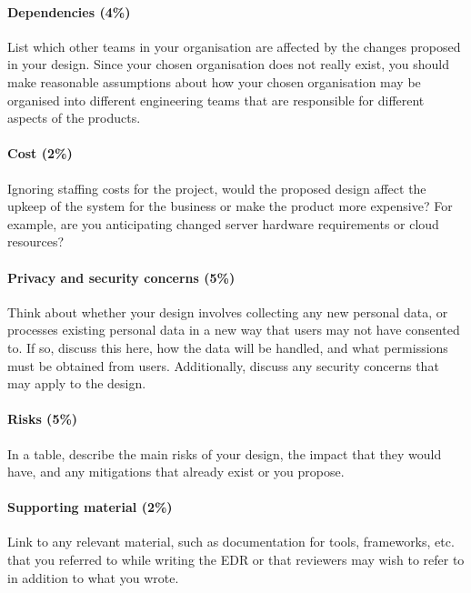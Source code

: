 \paragraph{Dependencies (4\%)} List which other teams in your organisation are affected by the changes proposed in your design. Since your chosen organisation does not really exist, you should make reasonable assumptions about how your chosen organisation may be organised into different engineering teams that are responsible for different aspects of the products.

\paragraph{Cost (2\%)} Ignoring staffing costs for the project, would the proposed design affect the upkeep of the system for the business or make the product more expensive? For example, are you anticipating changed server hardware requirements or cloud resources?

\paragraph{Privacy and security concerns (5\%)} Think about whether your design involves collecting any new personal data, or processes existing personal data in a new way that users may not have consented to. If so, discuss this here, how the data will be handled, and what permissions must be obtained from users. Additionally, discuss any security concerns that may apply to the design.

\paragraph{Risks (5\%)} In a table, describe the main risks of your design, the impact that they would have, and any mitigations that already exist or you propose.

\paragraph{Supporting material (2\%)} Link to any relevant material, such as documentation for tools, frameworks, etc. that you referred to while writing the EDR or that reviewers may wish to refer to in addition to what you wrote.

